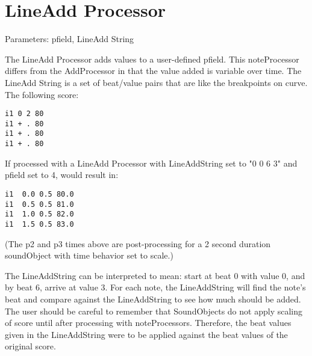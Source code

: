 \section{LineAdd Processor}\label{lineAddProcessor}

Parameters: pfield, LineAdd String

The LineAdd Processor adds values to a user-defined pfield. This
noteProcessor differs from the AddProcessor in that the value added is
variable over time. The LineAdd String is a set of beat/value pairs that
are like the breakpoints on curve. The following score:

\begin{verbatim}
i1 0 2 80
i1 + . 80
i1 + . 80
i1 + . 80
\end{verbatim}

If processed with a LineAdd Processor with LineAddString set to "0 0 6
3" and pfield set to 4, would result in:

\begin{verbatim}
i1  0.0 0.5 80.0
i1  0.5 0.5 81.0
i1  1.0 0.5 82.0
i1  1.5 0.5 83.0
\end{verbatim}

(The p2 and p3 times above are post-processing for a 2 second duration
soundObject with time behavior set to scale.)

The LineAddString can be interpreted to mean: start at beat 0 with value
0, and by beat 6, arrive at value 3. For each note, the LineAddString
will find the note's beat and compare against the LineAddString to see
how much should be added. The user should be careful to remember that
SoundObjects do not apply scaling of score until after processing with
noteProcessors. Therefore, the beat values given in the LineAddString
were to be applied against the beat values of the original score.
